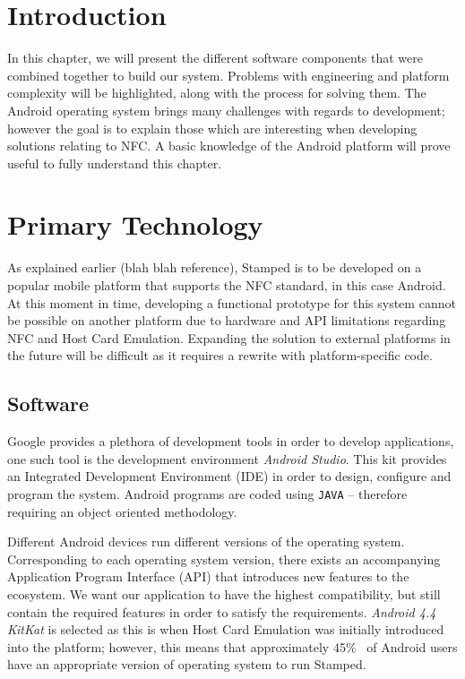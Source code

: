 \section{Introduction}
In this chapter, we will present the different software components that were combined together to build our system. Problems with engineering and platform complexity will be highlighted, along with the process for solving them. The Android operating system brings many challenges with regards to development; however the goal is to explain those which are interesting when developing solutions relating to NFC. A basic knowledge of the Android platform will prove useful to fully understand this chapter.
\section{Primary Technology}
As explained earlier (blah blah reference), Stamped is to be developed on a popular mobile platform that supports the NFC standard, in this case Android. At this moment in time, developing a functional prototype for this system cannot be possible on another platform due to hardware and API limitations regarding NFC and Host Card Emulation. Expanding the solution to external platforms in the future will be difficult as it requires a rewrite with platform-specific code.
\subsection{Software}
Google provides a plethora of development tools in order to develop applications, one such tool is the development environment \emph{Android Studio}. This kit provides an Integrated Development Environment (IDE) in order to design, configure and program the system. Android programs are coded using \texttt{JAVA} -- therefore requiring an object oriented methodology. 

Different Android devices run different versions of the operating system. Corresponding to each operating system version, there exists an accompanying Application Program Interface (API) that introduces new features to the ecosystem. We want our application to have the highest compatibility, but still contain the required features in order to satisfy the requirements. \emph{Android 4.4 KitKat} is selected as this is when Host Card Emulation was initially introduced into the platform; however, this means that approximately 45\%~\cite{Androidusagestats} of Android users have an appropriate version of operating system to run Stamped.

